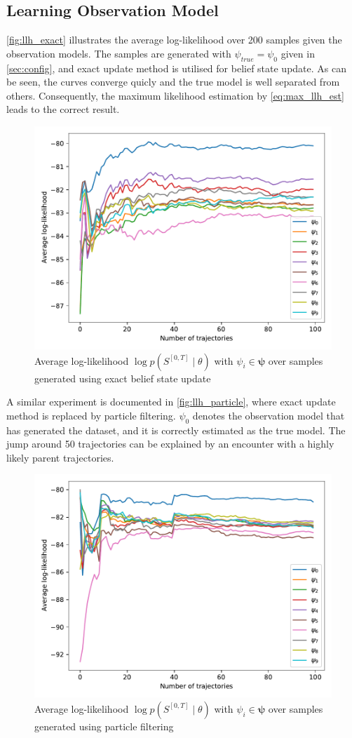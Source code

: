 \subsection{Learning Observation Model}
\autoref{fig:llh_exact} illustrates the average log-likelihood over 200 samples given the observation models. The samples are generated with $ \psi_{true} = \psi_0 $ given in \cref{sec:config}, and exact update method is utilised for belief state update. As can be seen, the curves converge quicly and the true model is well separated from others. Consequently, the maximum likelihood estimation by \autoref{eq:max_llh_est} leads to the correct result.
\begin{figure}[H]
	\begin{center}
		\includegraphics[width=.65\textwidth]{figures/roc_exactUpdate/llh_exactUpdate_psi_0}
		\caption{Average log-likelihood $ \log p(S^{[0,T]} \mid \theta) $ with $ \psi_i \in \symbf{\psi} $ over samples generated using exact belief state update}
		\label{fig:llh_exact}
	\end{center}
\end{figure} %
A similar experiment is documented in \autoref{fig:llh_particle}, where exact update method is replaced by particle filtering. $ \psi_0 $ denotes the observation model that has generated the dataset, and it is correctly estimated as the true model. The jump around 50 trajectories can be explained by an encounter with a highly likely parent trajectories.
\begin{figure}[H]
	\begin{center}
		\includegraphics[width=.65\textwidth]{figures/roc_particleFilter/llh_particleFilter_psi_0}
		\caption{Average log-likelihood $ \log p(S^{[0,T]} \mid \theta) $ with $ \psi_i \in \symbf{\psi} $ over samples generated using particle filtering}
		\label{fig:llh_particle}
	\end{center}
\end{figure} %
